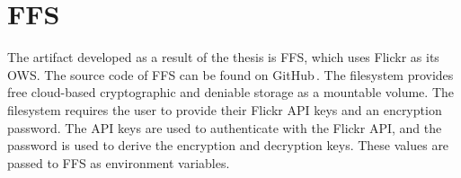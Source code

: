 \section{FFS}
\label{sec:res_ffs}
The artifact developed as a result of the thesis is \gls{FFS}, which uses Flickr as its \gls{OWS}. The source code of \gls{FFS} can be found on GitHub\,\cite{olssonFejkFileSystem2022}. The filesystem provides free cloud-based cryptographic and deniable storage as a mountable volume. The filesystem requires the user to provide their Flickr \gls{API} keys and an encryption password. The \gls{API} keys are used to authenticate with the Flickr \gls{API}, and the password is used to derive the encryption and decryption keys. These values are passed to \gls{FFS} as environment variables.
